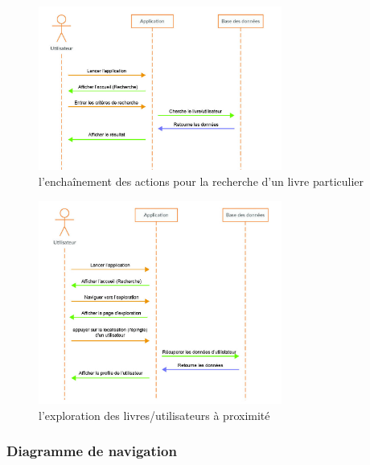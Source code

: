 \begin{figure}[h]
	\begin{center}
		\includegraphics[width=8cm]{Images/chapter3/rechercher_un_livre.jpg}
		\caption{{\footnotesize l'enchaînement des actions pour la recherche d'un  livre particulier}}
	\end{center}
\end{figure}

\begin{figure}[h]
	\begin{center}
		\includegraphics[width=8cm]{Images/chapter3/explorer_les_livres.jpg}
		\caption{{\footnotesize l'exploration des livres/utilisateurs à proximité}}
	\end{center}
\end{figure}

\newpage

\subsubsection{Diagramme de navigation}

